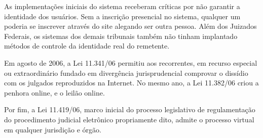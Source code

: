 	As implementações iniciais do sistema receberam críticas por
  não garantir a identidade dos usuários. Sem a inscrição
  presencial no sistema, qualquer um poderia se inscrever através
  do site alegando ser outra pessoa. Além dos Juizados Federais,
      os sistemas dos demais tribunais também não tinham
      implantado métodos de controle da identidade real do
      remetente.\par
	
	Em agosto de 2006, a Lei 11.341/06 permitiu aos recorrentes, em
  recurso especial ou extraordinário fundado em divergência
  jurisprudencial comprovar o dissídio com os julgados
  reproduzidos na Internet. No mesmo ano, a Lei 11.382/06 criou a
  penhora online, e o leilão online. \par
	
	Por fim, a Lei 11.419/06, marco inicial do processo legislativo
  de regulamentação do procedimento judicial eletrônico
  propriamente dito, admite o processo virtual em qualquer
  jurisdição e órgão. \par
